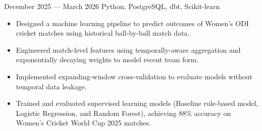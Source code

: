 
{December 2025 --- March 2026}
{Python, PostgreSQL, dbt, Scikit-learn}
  \begin{itemize}
    \item Designed a machine learning pipeline to predict outcomes of Women’s ODI cricket matches using historical ball-by-ball match data.
    \item Engineered match-level features using temporally-aware aggregation and exponentially decaying weights to model recent team form.
    \item Implemented expanding-window cross-validation to evaluate models without temporal data leakage.
    \item Trained and evaluated supervised learning models (Baseline rule-based model, Logistic Regression, and Random Forest), 
      achieving 88\% accuracy on Women’s Cricket World Cup 2025 matches.
  \end{itemize}
